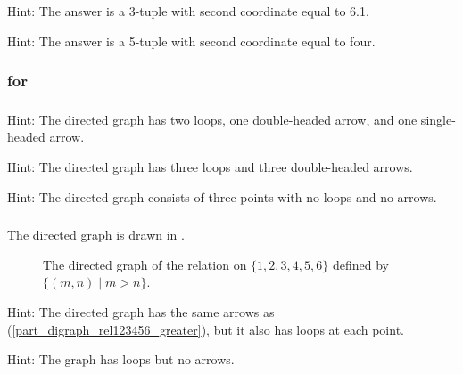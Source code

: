 \subsubsection*{ \answers}
\begin{apart}
    \item Hint: The answer is a 3-tuple with second coordinate equal to 6.1.
    \item Hint: The answer is a 5-tuple with second coordinate equal to four.
\end{apart}

\subsubsection{\answers for 
\subdefnrelation}

\subsubsection*{ \answers}
\begin{apart}
    \item Hint: The directed graph has two loops, one double-headed arrow, and one single-headed arrow.
    \item Hint: The directed graph has three loops and three double-headed arrows.
    \item Hint: The directed graph consists of three points with no loops and no arrows.
\end{apart}

\subsubsection*{ \answers}
\begin{apart}
    \item \label{part_digraph_rel123456_greater} The directed graph is drawn in .

        \begin{figure}[hbtp]
            \centering
            
            \caption{The directed graph of the relation on $\{1,2,3,4,5,6\}$ defined by $\{(m,n) \mid m > n\}$.}
            \label{fig_digraph_relon123456}
        \end{figure}
    \item Hint: The directed graph has the same arrows as (\ref{part_digraph_rel123456_greater}), but it also has loops at each point.
    \item Hint: The graph has loops but no arrows.
\end{apart}

